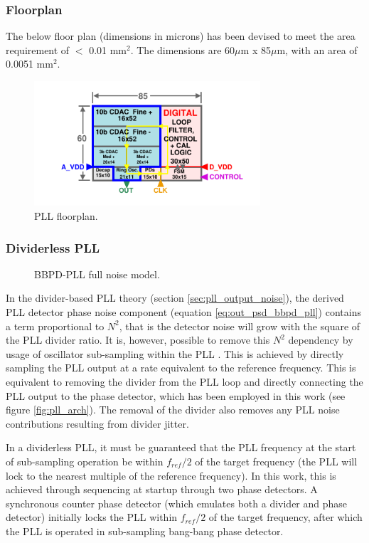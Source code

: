 	\subsubsection{Floorplan}
	The below floor plan (dimensions in microns) has been devised to meet the area requirement of $<$ 0.01 mm$^2$. The dimensions are 60$\mu$m x 85$\mu$m, with an area of 0.0051 mm$^2$.
		\begin{figure}[htb!]
	        \centering
	        \includegraphics[width=0.75\textwidth, angle=0]{./figs/design/pll_floorplan3}
		    \caption{PLL floorplan.}
		\end{figure}

\subsubsection{Dividerless PLL}
\vspace{-2em}
\begin{figure}[htb!]
	\center
	\caption{BBPD-PLL full noise model.}
	\label{fig:bbpll_full_noise}
\end{figure}

In the divider-based PLL theory (section \ref{sec:pll_output_noise}), the derived PLL detector phase noise component (equation \ref{eq:out_psd_bbpd_pll}) contains a term proportional to $N^2$, that is the detector noise will grow with the square of the PLL divider ratio. It is, however, possible to remove this $N^2$ dependency by usage of oscillator sub-sampling within the PLL \cite{Gao2015}. This is achieved by directly sampling the PLL output at a rate equivalent to the reference frequency. This is equivalent to removing the divider from the PLL loop and directly connecting the PLL output to the phase detector, which has been employed in this work (see figure \ref{fig:pll_arch}). The removal of the divider also removes any PLL noise contributions resulting from divider jitter. 

 In a dividerless PLL, it must be guaranteed that the PLL frequency at the start of sub-sampling operation be within $f_{ref}/2$ of the target frequency (the PLL will lock to the nearest multiple of the reference frequency). In this work, this is achieved through sequencing at startup through two phase detectors. A synchronous counter phase detector (which emulates both a divider and phase detector) initially locks the PLL within $f_{ref}/2$ of the target frequency, after which the PLL is operated in sub-sampling bang-bang phase detector.

